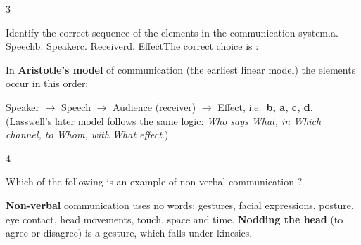 \begin{question}{3}
{Identify the correct sequence of the elements in the communication system.\newline a. Speech\newline b. Speaker\newline c. Receiver\newline d. Effect\newline The correct choice is :\par}
\begin{explain}
In \textbf{Aristotle's model} of communication (the earliest linear model) the elements occur in this order:
\begin{center}
\end{center}
Speaker $\rightarrow$ Speech $\rightarrow$ Audience (receiver) $\rightarrow$ Effect, i.e.\ \textbf{b, a, c, d}. (Lasswell's later model follows the same logic: \emph{Who says What, in Which channel, to Whom, with What effect}.)
\end{explain}
\end{question}

\begin{question}{4}
{Which of the following is an example of non-verbal communication ?\par}
\begin{explain}
\textbf{Non-verbal} communication uses no words: gestures, facial expressions, posture, eye contact, head movements, touch, space and time. \textbf{Nodding the head} (to agree or disagree) is a gesture, which falls under kinesics.
\end{explain}
\end{question}

